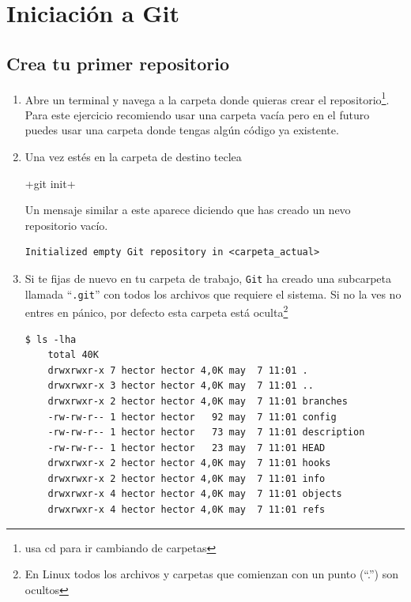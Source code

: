 \documentclass[a5paper, oneside,10pt]{article}
\begin{document}
  \section{Iniciación a Git}
    \subsection{Crea tu primer repositorio}
    \begin{enumerate}
      \item Abre un terminal y navega a la carpeta donde quieras crear el repositorio\footnote{usa cd para ir cambiando de carpetas}. Para este ejercicio recomiendo usar una carpeta vacía pero en el futuro puedes usar una carpeta donde tengas algún código ya existente. 
      
      \item Una vez estés en la carpeta de destino teclea
      
      \cverb+git init+
    
      Un mensaje similar a este aparece diciendo que has creado un nevo repositorio vacío.
      
      \begin{lstlisting}[style=custom, caption=Mensaje al inicializar git]
  Initialized empty Git repository in <carpeta_actual>
      \end{lstlisting}
      
      \item Si te fijas de nuevo en tu carpeta de trabajo, \verb+Git+ ha creado una subcarpeta llamada ``\verb+.git+'' con todos los archivos que requiere el sistema. Si no la ves no entres en pánico, por defecto esta carpeta está oculta\footnote{En Linux todos los archivos y carpetas que comienzan con un punto (``.'') son ocultos}
    
      \begin{lstlisting}[style=custom, caption=Archivos y subcarpetas por defecto del sistema .git]
  $ ls -lha
    total 40K
    drwxrwxr-x 7 hector hector 4,0K may  7 11:01 .
    drwxrwxr-x 3 hector hector 4,0K may  7 11:01 ..
    drwxrwxr-x 2 hector hector 4,0K may  7 11:01 branches
    -rw-rw-r-- 1 hector hector   92 may  7 11:01 config
    -rw-rw-r-- 1 hector hector   73 may  7 11:01 description
    -rw-rw-r-- 1 hector hector   23 may  7 11:01 HEAD
    drwxrwxr-x 2 hector hector 4,0K may  7 11:01 hooks
    drwxrwxr-x 2 hector hector 4,0K may  7 11:01 info
    drwxrwxr-x 4 hector hector 4,0K may  7 11:01 objects
    drwxrwxr-x 4 hector hector 4,0K may  7 11:01 refs
      \end{lstlisting}
    

\end{enumerate}
\end{document}
